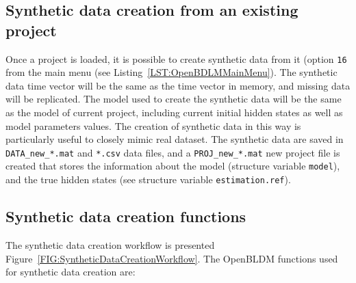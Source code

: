 \subsection{Synthetic data creation from an existing project}



Once a project is loaded, it is possible to create synthetic data from it (option \colorbox{light-gray}{\lstinline[basicstyle = \mlttfamily \small, backgroundcolor = \color{light-gray}]!16!} from the main menu (see Listing~\ref{LST:OpenBDLMMainMenu}).
The synthetic data time vector will be the same as the time vector in memory, and missing data will be replicated.
The model used to create the synthetic data will be the same as the model of current project, including current initial hidden states as well as model parameters values.
The creation of synthetic data in this way is particularly useful to closely mimic real dataset.
The synthetic data are saved in \lstinline[basicstyle = \mlttfamily \small, backgroundcolor = \color{light-gray}]!DATA_new_*.mat! and \lstinline[basicstyle = \mlttfamily \small, backgroundcolor = \color{light-gray}]!*.csv! data files, and a \lstinline[basicstyle = \mlttfamily \small, backgroundcolor = \color{light-gray}]!PROJ_new_*.mat! new project file is created that stores the information about the model (structure variable \lstinline[basicstyle = \mlttfamily \small, backgroundcolor = \color{light-gray}]!model!), and the true hidden states (see structure variable \lstinline[basicstyle = \mlttfamily \small, backgroundcolor = \color{light-gray}]!estimation.ref!).






\subsection{Synthetic data creation functions}


The synthetic data creation workflow is presented Figure~\ref{FIG:SyntheticDataCreationWorkflow}. 
The OpenBLDM functions used for synthetic data creation are:

